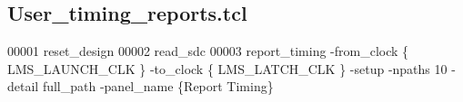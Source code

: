 \subsection{User\+\_\+timing\+\_\+reports.\+tcl}
\label{User__timing__reports_8tcl_source}

\begin{DoxyCode}
00001 reset\_design\textcolor{comment}{}
00002 \textcolor{comment}{}read\_sdc\textcolor{comment}{}
00003 \textcolor{comment}{}report\_timing -from\_clock \{ LMS\_LAUNCH\_CLK \} -to\_clock \{ LMS\_LATCH\_CLK \} -setup -npaths 10 -detail 
      full\_path -panel\_name \{Report Timing\}
\end{DoxyCode}
